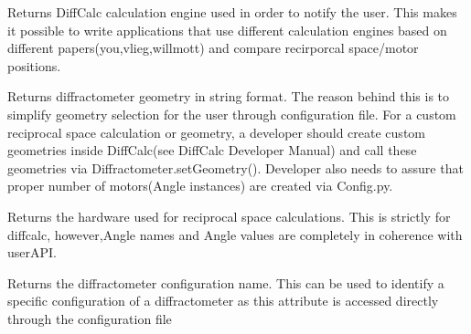 \documentclass[letterpaper,10pt,english]{sphinxmanual}
\begin{document}
\begin{fulllineitems}
\begin{fulllineitems}
\end{fulllineitems}


\begin{fulllineitems}
\label{Developer Manual:Diffractometer.Diffractometer.getEngine}
Returns DiffCalc calculation engine used in order to notify the user. This makes it possible to write applications that use different calculation engines based on different papers(you,vlieg,willmott) and compare recirporcal space/motor positions.

\end{fulllineitems}


\begin{fulllineitems}
\label{Developer Manual:Diffractometer.Diffractometer.getGeometry}
Returns diffractometer geometry in string format. The reason behind this is to simplify geometry selection for the user through configuration file. For a custom reciprocal space calculation or geometry, a developer should create custom geometries inside DiffCalc(see DiffCalc Developer Manual) and call these geometries via Diffractometer.setGeometry(). Developer also needs to assure that proper number of motors(Angle instances) are created via Config.py.

\end{fulllineitems}


\begin{fulllineitems}
\label{Developer Manual:Diffractometer.Diffractometer.getHardware}
Returns the hardware used for reciprocal space calculations. This is strictly for diffcalc,
however,Angle names and Angle values are completely in coherence with userAPI.

\end{fulllineitems}


\begin{fulllineitems}
\label{Developer Manual:Diffractometer.Diffractometer.getName}
Returns the diffractometer configuration name. This can be used to identify a specific configuration of a diffractometer as this attribute is accessed directly through the configuration file


\end{fulllineitems}
\end{fulllineitems}
\end{document}
